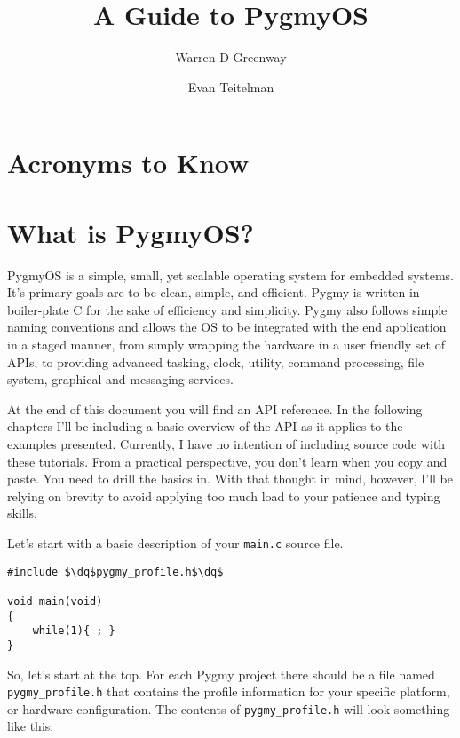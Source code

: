 \documentclass{article}
\newcommand{\dq}{\textquotedbl}
\begin{document}
\title{A Guide to PygmyOS}
\author{Warren D Greenway \and Evan Teitelman}
\maketitle

\tableofcontents

\section{Acronyms to Know}
\begin{acronym}
\end{acronym}

\section{What is PygmyOS?}
PygmyOS is a simple, small, yet scalable operating system for embedded systems. It's primary goals are to be clean, simple, and efficient. Pygmy is written in boiler-plate C for the sake of efficiency and simplicity. Pygmy also follows simple naming conventions and allows the OS to be integrated with the end application in a staged manner, from simply wrapping the hardware in a user friendly set of APIs, to providing advanced tasking, clock, utility, command processing, file system, graphical and messaging services.

At the end of this document you will find an API reference. In the following chapters I'll be including a basic overview of the API as it applies to the examples presented. Currently, I have no intention of including source code with these tutorials. From a practical perspective, you don't learn when you copy and paste. You need to drill the basics in. With that thought in mind, however, I'll be relying on brevity to avoid applying too much load to your patience and typing skills.

Let's start with a basic description of your \verb|main.c| source file.

\begin{lstlisting}
#include $\dq$pygmy_profile.h$\dq$

void main(void)
{
	while(1){ ; }
}
\end{lstlisting}

So, let's start at the top. For each Pygmy project there should be a file named \verb|pygmy_profile.h| that contains the profile information for your specific platform, or hardware configuration. The contents of \verb|pygmy_profile.h| will look something like this:
\end{document}
